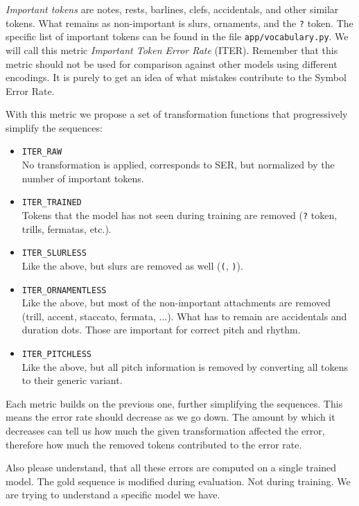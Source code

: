 \emph{Important tokens} are notes, rests, barlines, clefs, accidentals, and other similar tokens. What remains as non-important is slurs, ornaments, and the \verb`?` token. The specific list of important tokens can be found in the file \verb`app/`\allowbreak\verb`voca`\allowbreak\verb`bula`\allowbreak\verb`ry.py`. We will call this metric \emph{Important Token Error Rate} (ITER). Remember that this metric should not be used for comparison against other models using different encodings. It is purely to get an idea of what mistakes contribute to the Symbol Error Rate.

With this metric we propose a set of transformation functions that progressively simplify the sequences:

\begin{itemize}
\item \verb`ITER_RAW` \\ No transformation is applied, corresponds to SER, but normalized by the number of important tokens.
\item \verb`ITER_TRAINED` \\ Tokens that the model has not seen during training are removed (\verb`?` token, trills, fermatas, etc.).
\item \verb`ITER_SLURLESS` \\ Like the above, but slurs are removed as well (\verb`(`, \verb`)`).
\item \verb`ITER_ORNAMENTLESS` \\ Like the above, but most of the non-important attachments are removed (trill, accent, staccato, fermata, ...). What has to remain are accidentals and duration dots. Those are important for correct pitch and rhythm.
\item \verb`ITER_PITCHLESS` \\ Like the above, but all pitch information is removed by converting all tokens to their generic variant.
\end{itemize}

Each metric builds on the previous one, further simplifying the sequences. This means the error rate should decrease as we go down. The amount by which it decreases can tell us how much the given transformation affected the error, therefore how much the removed tokens contributed to the error rate.

Also please understand, that all these errors are computed on a single trained model. The gold sequence is modified during evaluation. Not during training. We are trying to understand a specific model we have.


